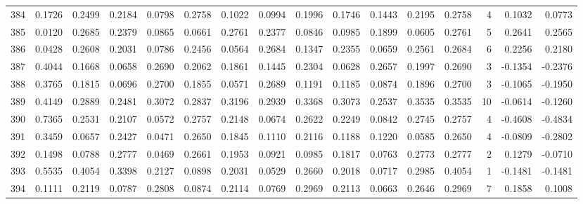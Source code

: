\begin{tabular}{lrrrrrrrrrrrrrrr}
384 &      0.1726 &  0.2499 &  0.2184 &  0.0798 &  0.2758 &  0.1022 &  0.0994 &  0.1996 &  0.1746 &  0.1443 &   0.2195 &     0.2758 &      4 &                    0.1032 &                     0.0773 \\
385 &      0.0120 &  0.2685 &  0.2379 &  0.0865 &  0.0661 &  0.2761 &  0.2377 &  0.0846 &  0.0985 &  0.1899 &   0.0605 &     0.2761 &      5 &                    0.2641 &                     0.2565 \\
386 &      0.0428 &  0.2608 &  0.2031 &  0.0786 &  0.2456 &  0.0564 &  0.2684 &  0.1347 &  0.2355 &  0.0659 &   0.2561 &     0.2684 &      6 &                    0.2256 &                     0.2180 \\
387 &      0.4044 &  0.1668 &  0.0658 &  0.2690 &  0.2062 &  0.1861 &  0.1445 &  0.2304 &  0.0628 &  0.2657 &   0.1997 &     0.2690 &      3 &                   -0.1354 &                    -0.2376 \\
388 &      0.3765 &  0.1815 &  0.0696 &  0.2700 &  0.1855 &  0.0571 &  0.2689 &  0.1191 &  0.1185 &  0.0874 &   0.1896 &     0.2700 &      3 &                   -0.1065 &                    -0.1950 \\
389 &      0.4149 &  0.2889 &  0.2481 &  0.3072 &  0.2837 &  0.3196 &  0.2939 &  0.3368 &  0.3073 &  0.2537 &   0.3535 &     0.3535 &     10 &                   -0.0614 &                    -0.1260 \\
390 &      0.7365 &  0.2531 &  0.2107 &  0.0572 &  0.2757 &  0.2148 &  0.0674 &  0.2622 &  0.2249 &  0.0842 &   0.2745 &     0.2757 &      4 &                   -0.4608 &                    -0.4834 \\
391 &      0.3459 &  0.0657 &  0.2427 &  0.0471 &  0.2650 &  0.1845 &  0.1110 &  0.2116 &  0.1188 &  0.1220 &   0.0585 &     0.2650 &      4 &                   -0.0809 &                    -0.2802 \\
392 &      0.1498 &  0.0788 &  0.2777 &  0.0469 &  0.2661 &  0.1953 &  0.0921 &  0.0985 &  0.1817 &  0.0763 &   0.2773 &     0.2777 &      2 &                    0.1279 &                    -0.0710 \\
393 &      0.5535 &  0.4054 &  0.3398 &  0.2127 &  0.0898 &  0.2031 &  0.0529 &  0.2660 &  0.2018 &  0.0717 &   0.2985 &     0.4054 &      1 &                   -0.1481 &                    -0.1481 \\
394 &      0.1111 &  0.2119 &  0.0787 &  0.2808 &  0.0874 &  0.2114 &  0.0769 &  0.2969 &  0.2113 &  0.0663 &   0.2646 &     0.2969 &      7 &                    0.1858 &                     0.1008 \\

\end{tabular}
